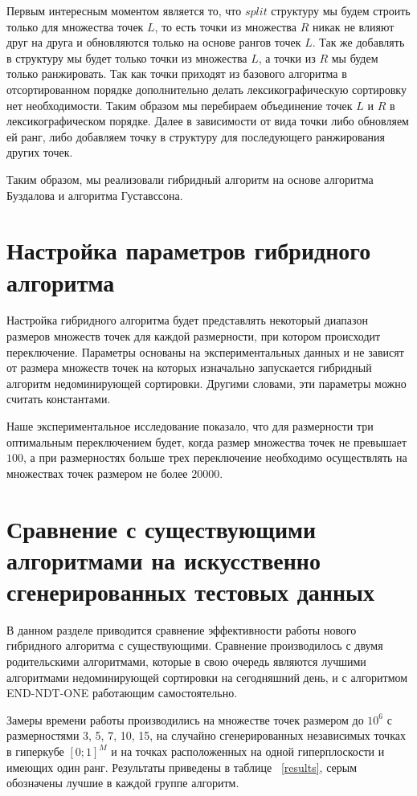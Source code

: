 Первым интересным моментом является то, что $split$ структуру мы будем строить только для множества точек $L$, то есть точки из множества $R$ никак не влияют друг на друга и обновляются только на основе рангов точек $L$. Так же добавлять в структуру мы будет только точки из множества $L$, а точки из $R$ мы будем только ранжировать. Так как точки приходят из базового алгоритма в отсортированном порядке дополнительно делать лексикографическую сортировку нет необходимости. Таким образом мы перебираем объединение точек $L$ и $R$ в лексикографическом порядке. Далее в зависимости от вида точки либо обновляем ей ранг, либо добавляем точку в структуру для последующего ранжирования других точек.

Таким образом, мы реализовали гибридный алгоритм на основе алгоритма Буздалова и алгоритма Густавссона. 

\section{Настройка параметров гибридного алгоритма}

Настройка гибридного алгоритма будет представлять некоторый диапазон размеров множеств точек для каждой размерности, при котором происходит переключение. Параметры основаны на экспериментальных данных и не зависят от размера множеств точек на которых изначально запускается гибридный алгоритм недоминирующей сортировки. Другими словами, эти параметры можно считать константами. 

Наше экспериментальное исследование показало, что для размерности три оптимальным переключением будет, когда размер множества точек не превышает $100$, а при размерностях больше трех переключение необходимо осуществлять на множествах точек размером не более $20 000$. 

\section{Сравнение с существующими алгоритмами на искусственно сгенерированных тестовых данных}

В данном разделе приводится сравнение эффективности работы нового гибридного алгоритма с существующими. Сравнение производилось с двумя родительскими алгоритмами, которые в свою очередь являются лучшими алгоритмами недоминирующей сортировки на сегодняшний день, и с алгоритмом END-NDT-ONE работающим самостоятельно.

Замеры времени работы производились на множестве точек размером до $10^6$ с размерностями 3, 5, 7, 10, 15, на случайно сгенерированных независимых точках в гиперкубе $[0; 1]^M$ и на точках расположенных на одной гиперплоскости и имеющих один ранг. Результаты приведены в таблице ~\ref{results}, серым обозначены лучшие в каждой группе алгоритм.

